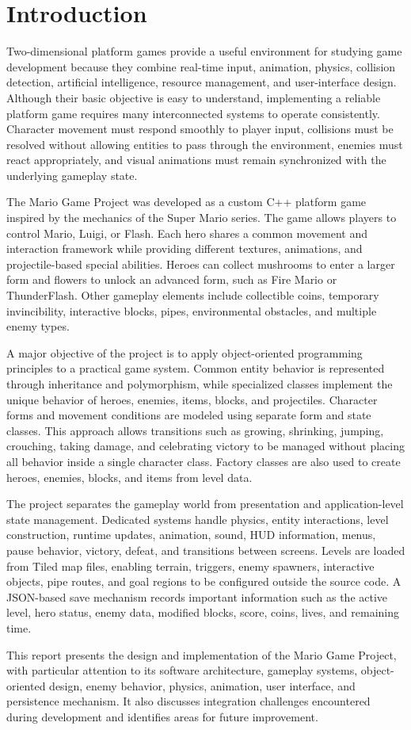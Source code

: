 \section{Introduction}
Two-dimensional platform games provide a useful environment for studying game development because they combine real-time input, animation, physics, collision detection, artificial intelligence, resource management, and user-interface design. Although their basic objective is easy to understand, implementing a reliable platform game requires many interconnected systems to operate consistently. Character movement must respond smoothly to player input, collisions must be resolved without allowing entities to pass through the environment, enemies must react appropriately, and visual animations must remain synchronized with the underlying gameplay state.

The Mario Game Project was developed as a custom C++ platform game inspired by the mechanics of the Super Mario series. The game allows players to control Mario, Luigi, or Flash. Each hero shares a common movement and interaction framework while providing different textures, animations, and projectile-based special abilities. Heroes can collect mushrooms to enter a larger form and flowers to unlock an advanced form, such as Fire Mario or ThunderFlash. Other gameplay elements include collectible coins, temporary invincibility, interactive blocks, pipes, environmental obstacles, and multiple enemy types.

A major objective of the project is to apply object-oriented programming principles to a practical game system. Common entity behavior is represented through inheritance and polymorphism, while specialized classes implement the unique behavior of heroes, enemies, items, blocks, and projectiles. Character forms and movement conditions are modeled using separate form and state classes. This approach allows transitions such as growing, shrinking, jumping, crouching, taking damage, and celebrating victory to be managed without placing all behavior inside a single character class. Factory classes are also used to create heroes, enemies, blocks, and items from level data.

The project separates the gameplay world from presentation and application-level state management. Dedicated systems handle physics, entity interactions, level construction, runtime updates, animation, sound, HUD information, menus, pause behavior, victory, defeat, and transitions between screens. Levels are loaded from Tiled map files, enabling terrain, triggers, enemy spawners, interactive objects, pipe routes, and goal regions to be configured outside the source code. A JSON-based save mechanism records important information such as the active level, hero status, enemy data, modified blocks, score, coins, lives, and remaining time.

This report presents the design and implementation of the Mario Game Project, with particular attention to its software architecture, gameplay systems, object-oriented design, enemy behavior, physics, animation, user interface, and persistence mechanism. It also discusses integration challenges encountered during development and identifies areas for future improvement.